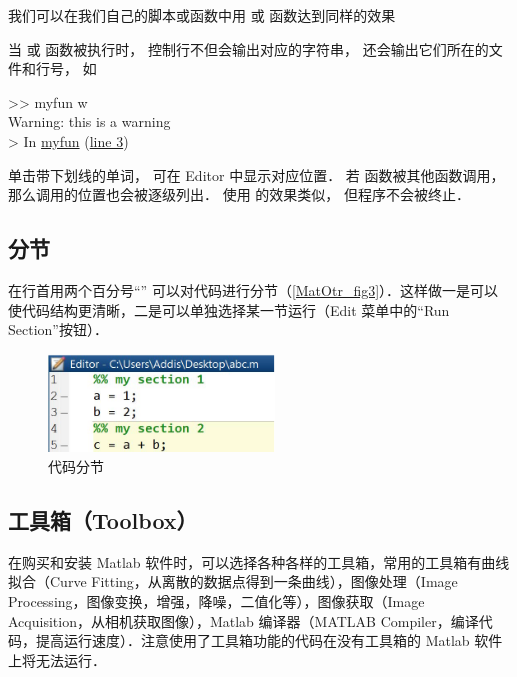 我们可以在我们自己的脚本或函数中用  或  函数达到同样的效果


当  或  函数被执行时， 控制行不但会输出对应的字符串， 还会输出它们所在的文件和行号， 如
\begin{Command}
>> myfun w\\
{\color{warning}Warning: this is a warning\\
> In \underline{myfun} (\underline{line 3})}
\end{Command}
单击带下划线的单词， 可在 Editor 中显示对应位置． 若  函数被其他函数调用， 那么调用的位置也会被逐级列出． 使用  的效果类似， 但程序不会被终止．

\subsection{分节}
在行首用两个百分号“\x{\%\%}” 可以对代码进行分节（\autoref{MatOtr_fig3}）．这样做一是可以使代码结构更清晰，二是可以单独选择某一节运行（Edit 菜单中的“Run Section”按钮）．
\begin{figure}[ht]
\centering
\includegraphics[width= 6cm]{./figures/MatOtr3.png}
\caption{代码分节}\label{MatOtr_fig3}
\end{figure}

\subsection{工具箱（Toolbox）}
在购买和安装 Matlab 软件时，可以选择各种各样的工具箱，常用的工具箱有曲线拟合（Curve Fitting，从离散的数据点得到一条曲线），图像处理（Image Processing，图像变换，增强，降噪，二值化等），图像获取（Image Acquisition，从相机获取图像），Matlab 编译器（MATLAB Compiler，编译代码，提高运行速度）．注意使用了工具箱功能的代码在没有工具箱的 Matlab 软件上将无法运行．




